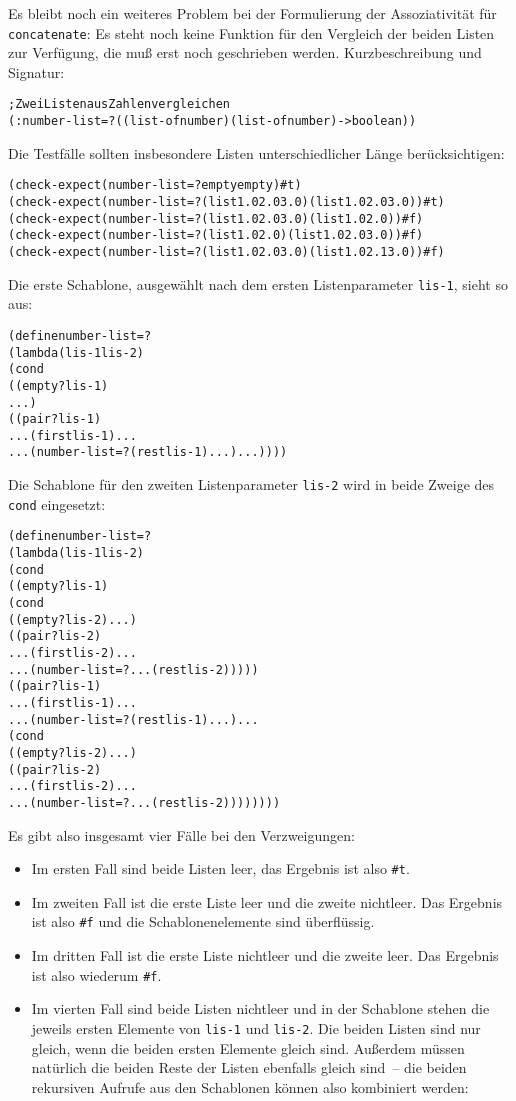 Es bleibt noch ein weiteres Problem bei der Formulierung der
Assoziativität für \texttt{concatenate}: Es steht noch keine Funktion
für den Vergleich der beiden Listen zur Verfügung, die muß erst noch
geschrieben werden.  Kurzbeschreibung und Signatur:
%
\begin{alltt}
; Zwei Listen aus Zahlen vergleichen
(: number-list=? ((list-of number) (list-of number) -> boolean))
\end{alltt}
%
Die Testfälle sollten insbesondere Listen unterschiedlicher Länge
berücksichtigen:
%
\begin{alltt}
(check-expect (number-list=? empty empty) #t)
(check-expect (number-list=? (list 1.0 2.0 3.0) (list 1.0 2.0 3.0)) #t)
(check-expect (number-list=? (list 1.0 2.0 3.0) (list 1.0 2.0)) #f)
(check-expect (number-list=? (list 1.0 2.0) (list 1.0 2.0 3.0)) #f)
(check-expect (number-list=? (list 1.0 2.0 3.0) (list 1.0 2.1 3.0)) #f)
\end{alltt}
%
Die erste Schablone, ausgewählt nach dem ersten Listenparameter
\texttt{lis-1}, sieht so aus:
% 
\begin{alltt}
(define number-list=?
  (lambda (lis-1 lis-2)
    (cond
      ((empty? lis-1)
       ...)
      ((pair? lis-1)
       ... (first lis-1) ...
       ... (number-list=? (rest lis-1) ...) ...))))
\end{alltt}
%
Die Schablone für den zweiten Listenparameter \texttt{lis-2} wird in
beide Zweige des \texttt{cond} eingesetzt:
%
\begin{alltt}
(define number-list=?
  (lambda (lis-1 lis-2)
    (cond
      ((empty? lis-1)
       (cond
         ((empty? lis-2) ...)
         ((pair? lis-2)
          ... (first lis-2) ...
          ... (number-list=? ... (rest lis-2)))))
      ((pair? lis-1)
       ... (first lis-1) ...
       ... (number-list=? (rest lis-1) ...) ...
       (cond
         ((empty? lis-2) ...)
         ((pair? lis-2)
          ... (first lis-2) ...
          ... (number-list=? ... (rest lis-2))))))))
\end{alltt}
%
Es gibt also insgesamt vier Fälle bei den Verzweigungen:
\begin{itemize}
\item Im ersten
Fall sind beide Listen leer, das Ergebnis ist also \texttt{\#t}.
\item Im zweiten Fall ist die erste Liste leer und die zweite
  nichtleer.  Das Ergebnis ist also \texttt{\#f} und die
  Schablonenelemente sind überflüssig.
\item Im dritten Fall ist die erste Liste nichtleer und die zweite
  leer.  Das Ergebnis ist also wiederum \texttt{\#f}.
\item Im vierten Fall sind beide Listen nichtleer und in der Schablone
  stehen die jeweils ersten Elemente von \texttt{lis-1} und
  \texttt{lis-2}.  Die beiden Listen sind nur gleich, wenn die beiden
  ersten Elemente gleich sind.  Außerdem müssen natürlich die beiden
  Reste der Listen ebenfalls gleich sind~-- die beiden rekursiven
  Aufrufe aus den Schablonen können also kombiniert werden:
\end{itemize}
